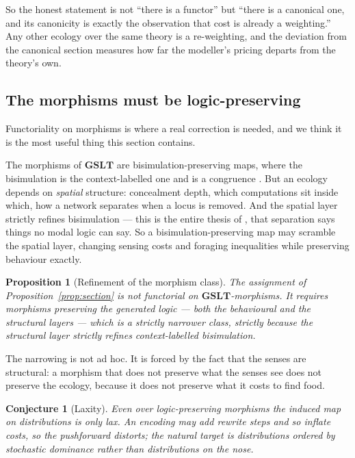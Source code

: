 \documentclass[11pt]{article}
\theoremstyle{plain}
\newtheorem{proposition}[theorem]{Proposition}
\newtheorem{conjecture}[theorem]{Conjecture}
\theoremstyle{definition}
\newcommand{\GSLT}{\mathbf{GSLT}}
\begin{document}
So the honest statement is not ``there is a functor'' but ``there is a canonical one, and its
canonicity is exactly the observation that cost is already a weighting.'' Any other ecology over the
same theory is a re-weighting, and the deviation from the canonical section measures how far the
modeller's pricing departs from the theory's own.

\subsection{The morphisms must be logic-preserving}

Functoriality on morphisms is where a real correction is needed, and we think it is the most useful
thing this section contains.

The morphisms of $\GSLT$ are bisimulation-preserving maps, where the bisimulation is the
context-labelled one and is a congruence \cite{Omnibus}. But an ecology depends on \emph{spatial}
structure: concealment depth, which computations sit inside which, how a network separates when a
locus is removed. And the spatial layer strictly refines bisimulation --- this is the entire thesis of
\cite{ClassifierNote}, that separation says things no modal logic can say. So a bisimulation-preserving
map may scramble the spatial layer, changing sensing costs and foraging inequalities while preserving
behaviour exactly.

\begin{proposition}[Refinement of the morphism class]
\label{prop:morphisms}
The assignment of Proposition~\ref{prop:section} is not functorial on $\GSLT$-morphisms. It requires
morphisms preserving the \emph{generated logic} --- both the behavioural and the structural layers ---
which is a strictly narrower class, strictly because the structural layer strictly refines
context-labelled bisimulation.
\end{proposition}

The narrowing is not ad hoc. It is forced by the fact that the senses are structural: a morphism that
does not preserve what the senses see does not preserve the ecology, because it does not preserve what
it costs to find food.

\begin{conjecture}[Laxity]
\label{conj:lax}
Even over logic-preserving morphisms the induced map on distributions is only lax. An encoding may add
rewrite steps and so inflate costs, so the pushforward distorts; the natural target is distributions
ordered by stochastic dominance rather than distributions on the nose.
\end{conjecture}
\end{document}
